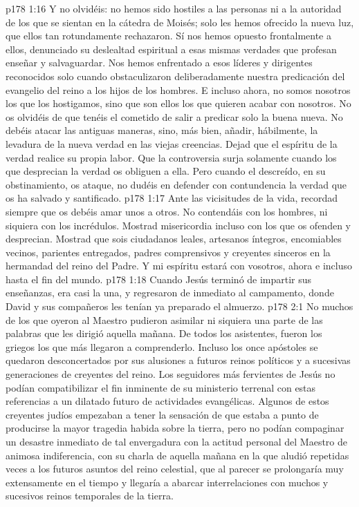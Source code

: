 \vs p178 1:16 Y no olvidéis: no hemos sido hostiles a las personas ni a la autoridad de los que se sientan en la cátedra de Moisés; solo les hemos ofrecido la nueva luz, que ellos tan rotundamente rechazaron. Sí nos hemos opuesto frontalmente a ellos, denunciado su deslealtad espiritual a esas mismas verdades que profesan enseñar y salvaguardar. Nos hemos enfrentado a esos líderes y dirigentes reconocidos solo cuando obstaculizaron deliberadamente nuestra predicación del evangelio del reino a los hijos de los hombres. E incluso ahora, no somos nosotros los que los hostigamos, sino que son ellos los que quieren acabar con nosotros. No os olvidéis de que tenéis el cometido de salir a predicar solo la buena nueva. No debéis atacar las antiguas maneras, sino, más bien, añadir, hábilmente, la levadura de la nueva verdad en las viejas creencias. Dejad que el espíritu de la verdad realice su propia labor. Que la controversia surja solamente cuando los que desprecian la verdad os obliguen a ella. Pero cuando el descreído, en su obstinamiento, os ataque, no dudéis en defender con contundencia la verdad que os ha salvado y santificado.
\vs p178 1:17 Ante las vicisitudes de la vida, recordad siempre que os debéis amar unos a otros. No contendáis con los hombres, ni siquiera con los incrédulos. Mostrad misericordia incluso con los que os ofenden y desprecian. Mostrad que sois ciudadanos leales, artesanos íntegros, encomiables vecinos, parientes entregados, padres comprensivos y creyentes sinceros en la hermandad del reino del Padre. Y mi espíritu estará con vosotros, ahora e incluso hasta el fin del mundo.
\vs p178 1:18 \pc Cuando Jesús terminó de impartir sus enseñanzas, era casi la una, y regresaron de inmediato al campamento, donde David y sus compañeros les tenían ya preparado el almuerzo.
\vs p178 2:1 No muchos de los que oyeron al Maestro pudieron asimilar ni siquiera una parte de las palabras que les dirigió aquella mañana. De todos los asistentes, fueron los griegos los que más llegaron a comprenderlo. Incluso los once apóstoles se quedaron desconcertados por sus alusiones a futuros reinos políticos y a sucesivas generaciones de creyentes del reino. Los seguidores más fervientes de Jesús no podían compatibilizar el fin inminente de su ministerio terrenal con estas referencias a un dilatado futuro de actividades evangélicas. Algunos de estos creyentes judíos empezaban a tener la sensación de que estaba a punto de producirse la mayor tragedia habida sobre la tierra, pero no podían compaginar un desastre inmediato de tal envergadura con la actitud personal del Maestro de animosa indiferencia, con su charla de aquella mañana en la que aludió repetidas veces a los futuros asuntos del reino celestial, que al parecer se prolongaría muy extensamente en el tiempo y llegaría a abarcar interrelaciones con muchos y sucesivos reinos temporales de la tierra.
